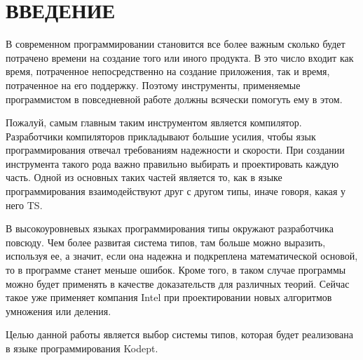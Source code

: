 \chapter*{ВВЕДЕНИЕ}
\label{ch:introduction}


В современном программировании становится все более важным сколько будет потрачено времени на создание того или иного продукта.
В это число входит как время, потраченное непосредственно на создание приложения, так и время, потраченное на его поддержку.
Поэтому инструменты, применяемые программистом в повседневной работе должны всячески помогуть ему в этом.

Пожалуй, самым главным таким инструментом является компилятор.
Разработчики компиляторов прикладывают большие усилия, чтобы язык программирования отвечал требованиям надежности и скорости.
При создании инструмента такого рода важно правильно выбирать и проектировать каждую часть.
Одной из основных таких частей является то, как в языке программирования взаимодействуют друг с другом типы, иначе говоря, какая у него \gls{TS}.

В высокоуровневых языках программирования типы окружают разработчика повсюду.
Чем более развитая система типов, там больше можно выразить, используя ее, а значит, если она надежна и подкреплена математической основой, то в программе станет меньше ошибок.
Кроме того, в таком случае программы можно будет применять в качестве доказательств для различных теорий.
Сейчас такое уже применяет компания Intel при проектировании новых алгоритмов умножения или деления.

Целью данной работы является выбор системы типов, которая будет реализована в языке программирования \gls{Kodept}.

